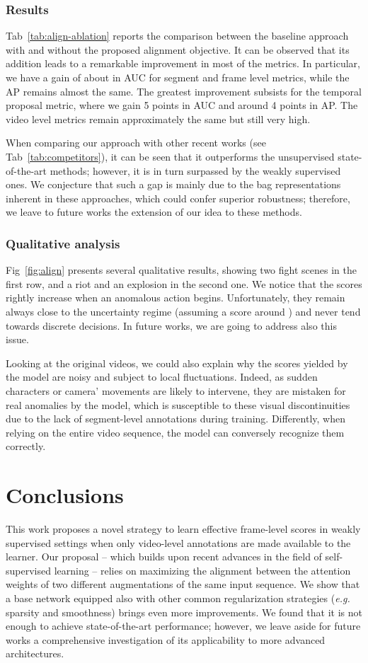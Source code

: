 \documentclass[runningheads]{llncs}
\begin{document}
\subsubsection{Results}
Tab~\ref{tab:align-ablation} reports the comparison between the baseline approach with and without the proposed alignment objective. It can be observed that its addition leads to a remarkable improvement in most of the metrics. In particular, we have a gain of about  in AUC for segment and frame level metrics, while the AP remains almost the same. The greatest improvement subsists for the temporal proposal metric, where we gain 5 points in AUC and around 4 points in AP. The video level metrics remain approximately the same but still very high.

When comparing our approach with other recent works (see Tab~\ref{tab:competitors}), it can be seen that it outperforms the unsupervised state-of-the-art methods; however, it is in turn surpassed by the weakly supervised ones. We conjecture that such a gap is mainly due to the bag representations inherent in these approaches, which could confer superior robustness; therefore, we leave to future works the extension of our idea to these methods.
\subsubsection{Qualitative analysis} Fig~\ref{fig:align} presents several qualitative results, showing two fight scenes in the first row, and a riot and an explosion in the second one. We notice that the scores rightly increase when an anomalous action begins. Unfortunately, they remain always close to the uncertainty regime (assuming a score around ) and never tend towards discrete decisions. In future works, we are going to address also this issue.

Looking at the original videos, we could also explain why the scores yielded by the model are noisy and subject to local fluctuations. Indeed, as sudden characters or camera' movements are likely to intervene, they are mistaken for real anomalies by the model, which is susceptible to these visual discontinuities due to the lack of segment-level annotations during training. Differently, when relying on the entire video sequence, the model can conversely recognize them correctly. \section{Conclusions}
This work proposes a novel strategy to learn effective frame-level scores in weakly supervised settings when only video-level annotations are made available to the learner. Our proposal -- which builds upon recent advances in the field of self-supervised learning -- relies on maximizing the alignment between the attention weights of two different augmentations of the same input sequence. We show that a base network equipped also with other common regularization strategies (\textit{e.g.} sparsity and smoothness) brings even more improvements. We found that it is not enough to achieve state-of-the-art performance; however, we leave aside for future works a comprehensive investigation of its applicability to more advanced architectures.
\end{document}
